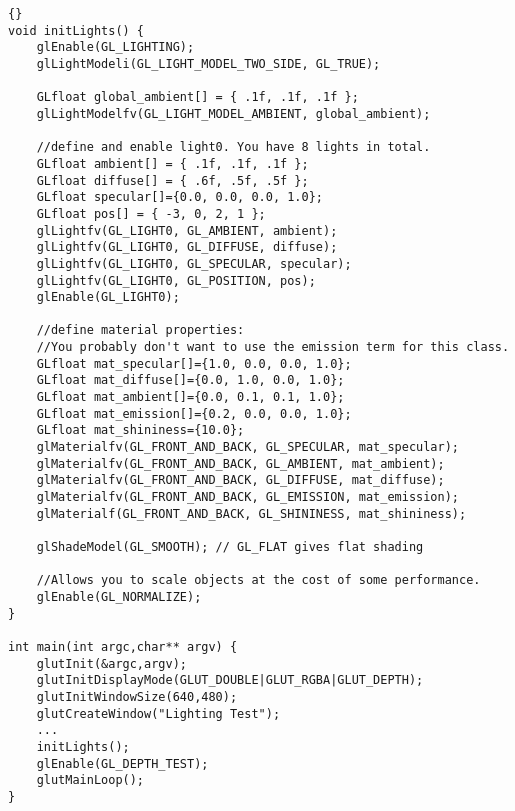 \documentclass[]{article}
\begin{document}
\lstset{language=c++}
\lstset{commentstyle=\textit}
\begin{lstlisting}[frame=TRBL, caption=Lighting Example]{}
void initLights() {
    glEnable(GL_LIGHTING);
    glLightModeli(GL_LIGHT_MODEL_TWO_SIDE, GL_TRUE);

    GLfloat global_ambient[] = { .1f, .1f, .1f };
    glLightModelfv(GL_LIGHT_MODEL_AMBIENT, global_ambient);

    //define and enable light0. You have 8 lights in total.
    GLfloat ambient[] = { .1f, .1f, .1f };
    GLfloat diffuse[] = { .6f, .5f, .5f };
    GLfloat specular[]={0.0, 0.0, 0.0, 1.0};
    GLfloat pos[] = { -3, 0, 2, 1 };
    glLightfv(GL_LIGHT0, GL_AMBIENT, ambient);
    glLightfv(GL_LIGHT0, GL_DIFFUSE, diffuse);
    glLightfv(GL_LIGHT0, GL_SPECULAR, specular);
    glLightfv(GL_LIGHT0, GL_POSITION, pos);
    glEnable(GL_LIGHT0);

    //define material properties:
    //You probably don't want to use the emission term for this class.
    GLfloat mat_specular[]={1.0, 0.0, 0.0, 1.0};
    GLfloat mat_diffuse[]={0.0, 1.0, 0.0, 1.0};
    GLfloat mat_ambient[]={0.0, 0.1, 0.1, 1.0};
    GLfloat mat_emission[]={0.2, 0.0, 0.0, 1.0};
    GLfloat mat_shininess={10.0};
    glMaterialfv(GL_FRONT_AND_BACK, GL_SPECULAR, mat_specular);
    glMaterialfv(GL_FRONT_AND_BACK, GL_AMBIENT, mat_ambient);
    glMaterialfv(GL_FRONT_AND_BACK, GL_DIFFUSE, mat_diffuse);
    glMaterialfv(GL_FRONT_AND_BACK, GL_EMISSION, mat_emission);
    glMaterialf(GL_FRONT_AND_BACK, GL_SHININESS, mat_shininess);

    glShadeModel(GL_SMOOTH); // GL_FLAT gives flat shading

    //Allows you to scale objects at the cost of some performance.
    glEnable(GL_NORMALIZE); 
}

int main(int argc,char** argv) {
	glutInit(&argc,argv);
	glutInitDisplayMode(GLUT_DOUBLE|GLUT_RGBA|GLUT_DEPTH);
	glutInitWindowSize(640,480);
	glutCreateWindow("Lighting Test");
	...
	initLights();
	glEnable(GL_DEPTH_TEST);
	glutMainLoop();
}
\end{lstlisting}
\end{document}
